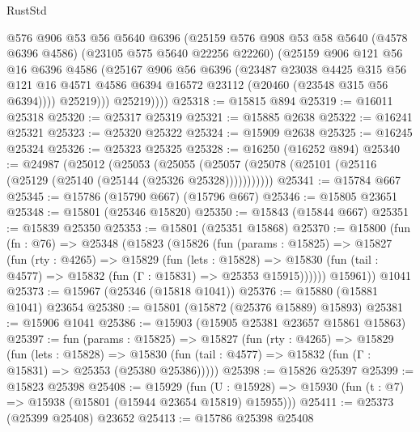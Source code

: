 \begin{lexlean}{RustStd}
\begin{coremodule}
              @576
              @906
              @53
              @56
              @5640
              @6396
              (@25159
                @576
                @908
                @53
                @58
                @5640
                (@4578 @6396 @4586)
                (@23105 @575 @5640 @22256 @22260)
                (@25159
                  @906
                  @121
                  @56
                  @16
                  @6396
                  @4586
                  (@25167
                    @906
                    @56
                    @6396
                    (@23487
                      @23038
                      @4425
                      @315
                      @56
                      @121
                      @16
                      @4571
                      @4586
                      @6394
                      @16572
                      @23112
                      (@20460 (@23548 @315 @56 @6394))))
                  @25219)))
            @25219))))
@25318 := @15815 @894
@25319 := @16011 @25318
@25320 := @25317 @25319
@25321 := @15885 @2638
@25322 := @16241 @25321
@25323 := @25320 @25322
@25324 := @15909 @2638
@25325 := @16245 @25324
@25326 := @25323 @25325
@25328 := @16250 (@16252 @894)
@25340 := @24987
    (@25012
      (@25053
        (@25055 (@25057 (@25078 (@25101 (@25116 (@25129 (@25140 (@25144 (@25326 @25328)))))))))))
@25341 := @15784 @667
@25345 := @15786 (@15790 @667) (@15796 @667)
@25346 := @15805 @23651
@25348 := @15801 (@25346 @15820)
@25350 := @15843 (@15844 @667)
@25351 := @15839 @25350
@25353 := @15801 (@25351 @15868)
@25370 := @15800
    (fun (fn : @76) =>
    @25348
      (@15823
        (@15826
          (fun (params : @15825) =>
          @15827
            (fun (rty : @4265) =>
            @15829
              (fun (lets : @15828) =>
              @15830 (fun (tail : @4577) => @15832 (fun (Γ : @15831) => @25353 @15915))))))
        @15961))
    @1041
@25373 := @15967 (@25346 (@15818 @1041))
@25376 := @15880 (@15881 @1041) @23654
@25380 := @15801 (@15872 (@25376 @15889) @15893)
@25381 := @15906 @1041
@25386 := @15903 (@15905 @25381 @23657 @15861 @15863)
@25397 := fun (params : @15825) =>
  @15827
    (fun (rty : @4265) =>
    @15829
      (fun (lets : @15828) =>
      @15830 (fun (tail : @4577) => @15832 (fun (Γ : @15831) => @25353 (@25380 @25386)))))
@25398 := @15826 @25397
@25399 := @15823 @25398
@25408 := @15929
    (fun (U : @15928) => @15930 (fun (t : @7) => @15938 (@15801 (@15944 @23654 @15819) @15955)))
@25411 := @25373 (@25399 @25408) @23652
@25413 := @15786 @25398 @25408

\end{coremodule}
\end{lexlean}
